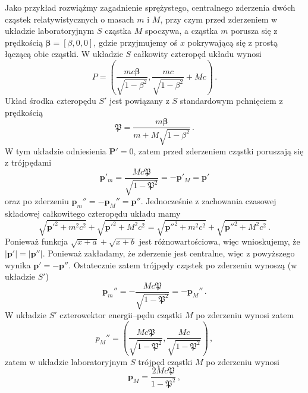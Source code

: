 \documentclass[../main.tex]{subfiles}
\begin{document}
Jako przykład rozwiążmy zagadnienie sprężystego, centralnego zderzenia dwóch cząstek relatywistycznych o masach \(m\) i \(M\), przy czym przed zderzeniem w układzie laboratoryjnym \(S\) cząstka \(M\) spoczywa, a cząstka \(m\) porusza się z prędkością \(\boldsymbol{\beta}=[\beta,0,0]\), gdzie przyjmujemy oś \(x\) pokrywającą się z prostą łączącą obie cząstki. W układzie \(S\) całkowity czteropęd układu wynosi
\begin{equation*}
    P=\left(\frac{mc\boldsymbol{\beta}}{\sqrt{1-\beta^2}},\frac{mc}{\sqrt{1-\beta^2}}+Mc\right)\,.
\end{equation*}
Układ środka czteropędu \(S'\) jest powiązany z \(S\) standardowym pchnięciem z prędkością
\begin{equation*}
    \boldsymbol{\mathfrak{P}}=\frac{m\boldsymbol{\beta}}{m+M\sqrt{1-\beta^2}}\,.
\end{equation*}
W tym układzie odniesienia \(\mathbf{P}'=0\), zatem przed zderzeniem cząstki poruszają się z trójpędami
\begin{equation*}
    \mathbf{p}'_m=\frac{Mc\boldsymbol{\mathfrak{P}}}{\sqrt{1-\mathfrak{P}^2}}=-\mathbf{p}'_M=\mathbf{p}'
\end{equation*}
oraz po zderzeniu \(\mathbf{p}_m''=-\mathbf{p}_M''=\mathbf{p}''\). Jednocześnie z zachowania czasowej składowej całkowitego czteropędu układu mamy
\begin{equation*}
    \sqrt{\mathbf{p}'^2+m^2c^2}+\sqrt{\mathbf{p}'^2+M^2c^2}=\sqrt{\mathbf{p}''^2+m^2c^2}+\sqrt{\mathbf{p}''^2+M^2c^2}\,.
\end{equation*}
Ponieważ funkcja \(\sqrt{x+a}+\sqrt{x+b}\) jest różnowartościowa, więc wnioskujemy, że \(|\mathbf{p}'|=|\mathbf{p}''|\). Ponieważ zakładamy, że zderzenie jest centralne, więc z powyższego wynika \(\mathbf{p}'=-\mathbf{p}''\). Ostatecznie zatem trójpędy cząstek po zderzeniu wynoszą (w układzie \(S'\))
\begin{equation*}
    \mathbf{p}_m''=-\frac{Mc\boldsymbol{\mathfrak{P}}}{\sqrt{1-\mathfrak{P}^2}}=-\mathbf{p}_M''\,.
\end{equation*}
W układzie \(S'\) czterowektor energii--pędu cząstki \(M\) po zderzeniu wynosi zatem
\begin{equation*}
    p_M''=\left(\frac{Mc\boldsymbol{\mathfrak{P}}}{\sqrt{1-\mathfrak{P}^2}},\frac{Mc}{\sqrt{1-\mathfrak{P}^2}}\right)\,,
\end{equation*}
zatem w układzie laboratoryjnym \(S\) trójpęd cząstki \(M\) po zderzeniu wynosi
\begin{equation*}
    \mathbf{p}_M=\frac{2Mc\boldsymbol{\mathfrak{P}}}{1-\mathfrak{P}^2}\,,
\end{equation*}
\end{document}
